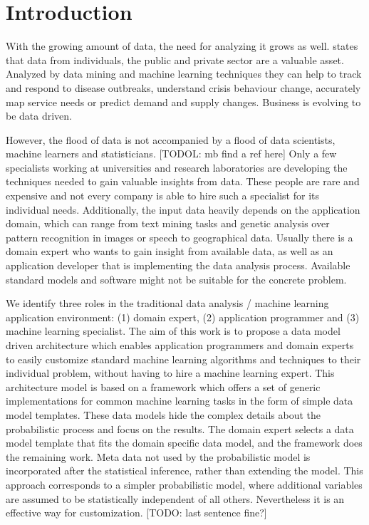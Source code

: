 \section{Introduction}

With the growing amount of data, the need for analyzing it grows as well. \textcite{forum2012bigdata} states that data from individuals, the public and private sector are a valuable asset. Analyzed by data mining and machine learning techniques they can help to track and respond to disease outbreaks, understand crisis behaviour change, accurately map service needs or predict demand and supply changes. Business is evolving to be data driven.

However, the flood of data is not accompanied by a flood of data scientists, machine learners and statisticians. [TODOL: mb find a ref here] Only a few specialists working at universities and research laboratories are developing the techniques needed to gain valuable insights from data. These people are rare and expensive and not every company is able to hire such a specialist for its individual needs. Additionally, the input data heavily depends on the application domain, which can range from text mining tasks and genetic analysis over pattern recognition in images or speech to geographical data. Usually there is a domain expert who wants to gain insight from available data, as well as an application developer that is implementing the data analysis process. Available standard models and software might not be suitable for the concrete problem.

We identify three roles in the traditional data analysis / machine learning application environment: (1) domain expert, (2) application programmer and (3) machine learning specialist. The aim of this work is to propose a data model driven architecture which enables application programmers and domain experts to easily customize standard machine learning algorithms and techniques to their individual problem, without having to hire a machine learning expert. This architecture model is based on a framework which offers a set of generic implementations for common machine learning tasks in the form of simple data model templates. These data models hide the complex details about the probabilistic process and focus on the results. The domain expert selects a data model template that fits the domain specific data model, and the framework does the remaining work. Meta data not used by the probabilistic model is incorporated after the statistical inference, rather than extending the model. This approach corresponds to a simpler probabilistic model, where additional variables are assumed to be statistically independent of all others. Nevertheless it is an effective way for customization. [TODO: last sentence fine?]


